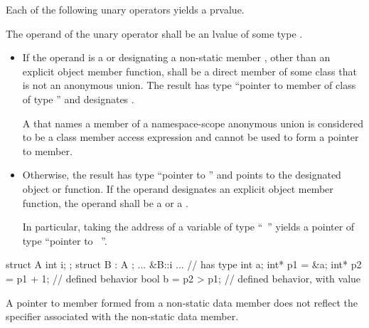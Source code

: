 \pnum
Each of the following unary operators yields a prvalue.

\pnum
{}%
%
The operand of the unary \tcode{\&} operator
shall be an lvalue of some type .
\begin{itemize}
\item
If the operand is a  or 
designating a non-static member ,
other than an explicit object member function,
 shall be a direct member of some class 
that is not an anonymous union.
The result has type ``pointer to member of class  of type ''
and designates .
\begin{note}
A 
that names a member of a namespace-scope anonymous union
is considered to be a class member access expression
and cannot be used to form a pointer to member.
\end{note}
\item
Otherwise, the result has type ``pointer to '' and points to
the designated object or function.
If the operand designates an explicit object member function,
the operand shall be
a  or a .
\begin{note}
In particular, taking the address of a variable of type ``\cv{}~''
yields a pointer of type ``pointer to \cv{}~''.
\end{note}
\end{itemize}
\begin{example}
\begin{codeblock}
struct A { int i; };
struct B : A { };
... &B::i ...       // has type 
int a;
int* p1 = &a;
int* p2 = p1 + 1;   // defined behavior
bool b = p2 > p1;   // defined behavior, with value 
\end{codeblock}
\end{example}
\begin{note}
A pointer to member formed from a  non-static data
member does not reflect the  specifier
associated with the non-static data member.
\end{note}


